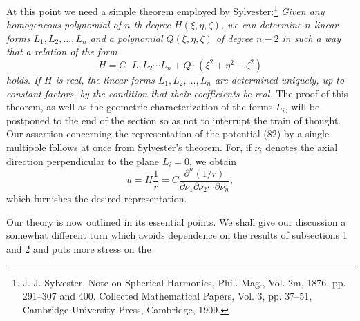 At this point we need a simple theorem employed by Sylvester:\footnote{J. J. Sylvester, Note on Spherical Harmonics, Phil. Mag., Vol. 2m, 1876, pp. 291--307 and 400. Collected Mathematical Papers, Vol. 3, pp. 37--51, Cambridge University Press, Cambridge, 1909.} \emph{Given any homogeneous polynomial of $n$-th degree $H(\xi,\eta,\zeta)$, we can determine $n$ linear forms $L_1,L_2,\ldots,L_n$ and a polynomial $Q(\xi,\eta,\zeta)$ of degree $n-2$ in such a way that a relation of the form}
\[
H=C\cdot L_1L_2\cdots L_n+Q\cdot(\xi^2+\eta^2+\zeta^2)
\]
\emph{holds. If $H$ is real, the linear forms $L_1,L_2,\ldots,L_n$ are determined uniquely, up to constant factors, by the condition that their coefficients be real.} The proof of this theorem, as well as the geometric characterization of the forms $L_i$, will be postponed to the end of the section so as not to interrupt the train of thought. Our assertion concerning the representation of the potential (82) by a single multipole follows at once from Sylvester's theorem. For, if $\nu_i$ denotes the axial direction perpendicular to the plane $L_i=0$, we obtain
\[
u=H\frac1r=C\frac{\partial^n(1/r)}{\partial\nu_1\partial\nu_2\cdots\partial\nu_n},
\]
which furnishes the desired representation.

Our theory is now outlined in its essential points. We shall give our discussion a somewhat different turn which avoids dependence on the results of subsections 1 and 2 and puts more stress on the

